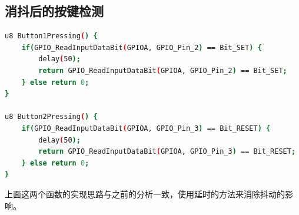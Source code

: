 	\subsection{消抖后的按键检测}
		\par 
		\begin{lstlisting}[language=bash, style=customStyleC, caption=消抖后的按键检测函数]
u8 Button1Pressing() {
	if(GPIO_ReadInputDataBit(GPIOA, GPIO_Pin_2) == Bit_SET) {
		delay(50);
		return GPIO_ReadInputDataBit(GPIOA, GPIO_Pin_2) == Bit_SET;
	} else return 0;
}

u8 Button2Pressing() {
	if(GPIO_ReadInputDataBit(GPIOA, GPIO_Pin_3) == Bit_RESET) {
		delay(50);
		return GPIO_ReadInputDataBit(GPIOA, GPIO_Pin_3) == Bit_RESET;
	} else return 0;
}
		\end{lstlisting}
		\par 
		上面这两个函数的实现思路与之前的分析一致，使用延时的方法来消除抖动的影响。


















